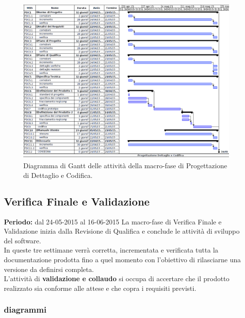 \begin{figure}[h]
\begin{center}
\includegraphics[width=\textwidth, height=\textheight, keepaspectratio]{img/progdet-gantt.png}
\caption{Diagramma di Gantt delle attività della macro-fase di Progettazione di Dettaglio e Codifica.}
\end{center}
\end{figure}
\clearpage


\subsection{Verifica Finale e Validazione}
\textbf{Periodo:} dal 24-05-2015 al 16-06-2015 
La macro-fase di Verifica Finale e Validazione inizia dalla Revisione di Qualifica e conclude le attività di sviluppo del software. \\
In queste tre settimane verrà corretta, incrementata e verificata tutta la documentazione prodotta fino a quel momento con l'obiettivo di rilasciarne una versione da definirsi completa. \\
L'attività di \textbf{validazione e collaudo} si occupa di accertare che il prodotto realizzato sia conforme alle attese e che copra i requisiti previsti. \\

\newpage
\subsubsection{diagrammi}


